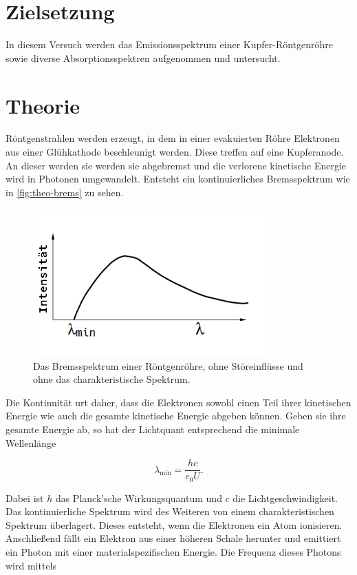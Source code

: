 \section{Zielsetzung}
In diesem Versuch werden das Emissionsspektrum einer Kupfer-Röntgenröhre sowie diverse Absorptionsspektren aufgenommen und untersucht.

\section{Theorie}
\label{sec:Theorie}

Röntgenstrahlen werden erzeugt, in dem in einer evakuierten Röhre Elektronen aus einer Glühkathode beschleunigt werden.
Diese treffen auf eine Kupferanode. An dieser werden sie werden sie abgebremst und die verlorene kinetische Energie wird in Photonen umgewandelt. Entsteht ein kontinuierliches Bremsspektrum wie in \autoref{fig:theo-brems} zu sehen.

\begin{figure}
    \centering
    \includegraphics[width=0.8\textwidth]{content/bremsspektrum.PNG}
    \caption{Das Bremsspektrum einer Röntgenröhre, ohne Störeinflüsse und ohne das charakteristische Spektrum\cite{V602}.}
    \label{fig:theo-brems}
\end{figure}

Die Kontinuität urt daher, dass die Elektronen sowohl einen Teil ihrer kinetischen Energie wie auch die gesamte kinetische Energie abgeben können.
Geben sie ihre gesamte Energie ab, so hat der Lichtquant entsprechend die minimale Wellenlänge

\begin{equation}
    \label{eqn:lambda-min}
    \lambda_\text{min} = \frac{h c}{e_0 U}.
\end{equation}

Dabei ist $h$ das Planck'sche Wirkungsquantum und $c$ die Lichtgeschwindigkeit.
Das kontinuierliche Spektrum wird des Weiteren von einem charakteristischen Spektrum überlagert.
Dieses entsteht, wenn die Elektronen ein Atom ionisieren. Anschließend fällt ein Elektron aus einer höheren Schale herunter und emittiert ein Photon mit einer materialspezifischen Energie.
Die Frequenz dieses Photons wird mittels


